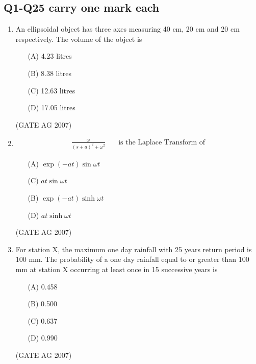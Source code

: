 \documentclass[journal,12pt,onecolumn]{IEEEtran}
\theoremstyle{remark}
\begin{document}
\subsection*{Q1-Q25 carry one mark each}

\begin{enumerate}[label=Q\arabic*:]

\item  An ellipsoidal object has three axes measuring 40 cm, 20 cm and 20 cm respectively.
The volume of the object is
\begin{multicols}{4}
  \begin{enumerate}
  \item[(A)] 4.23 litres
 \item[(B)] 8.38 litres
 \item[(C)] 12.63 litres
  \item[(D)] 17.05 litres
\end{enumerate}  
\end{multicols}
\hfill(GATE AG 2007)
 
\item 
\begin{align*}
\frac{\omega}{(s + a)^2 + \omega^2} &\quad \text{is the Laplace Transform of}
\end{align*}
\begin{multicols}{2}
\begin{enumerate}
  \item[(A)] $\exp(-at) \sin \omega t$
  \item[(C)] $at \sin \omega t$
  \item[(B)] $\exp(-at) \sinh \omega t$
  \item[(D)] $at \sinh \omega t$
\end{enumerate}
\end{multicols}
\hfill(GATE AG 2007)


\item  For station X, the maximum one day rainfall with 25 years return period is 100 mm.
The probability of a one day rainfall equal to or greater than 100 mm at station X occurring at least once in 15 successive years is
\begin{multicols}{4}
\begin{enumerate}
  \item[(A)] 0.458
  \item[(B)] 0.500
  \item[(C)] 0.637
  \item[(D)] 0.990
\end{enumerate}
\end{multicols}
\hfill(GATE AG 2007)


\end{enumerate}
\end{document}
